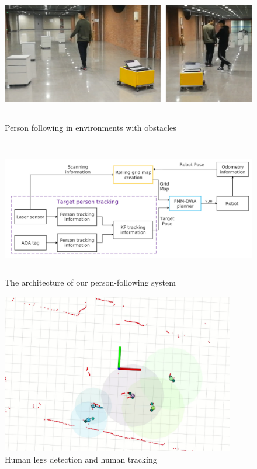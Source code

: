 \begin{figure}[h]
  \begin{center}
  \includegraphics[height=60mm,clip]{figure/2-3_real.png}
  \caption{Person following in environments with obstacles
  \cite{A Robust Autonomous Following Method for Mobile Robots in Dynamic Environments}}
  \label{2-3_real}
  \end{center}
\end{figure}

\begin{figure}[h]
  \begin{center}
  \includegraphics[height=60mm,clip]{figure/2-3_system.png}
  \caption{The architecture of our person-following system
  \cite{A Robust Autonomous Following Method for Mobile Robots in Dynamic Environments}}
  \label{2-3_system}
  \end{center}
\end{figure}

\begin{figure}[h]
  \begin{center}
  \includegraphics[height=70mm,clip]{figure/2-3_overview.png}
  \caption{Human legs detection and human tracking
  \cite{A Robust Autonomous Following Method for Mobile Robots in Dynamic Environments}}
  \label{2-3_overview}
  \end{center}
\end{figure}

